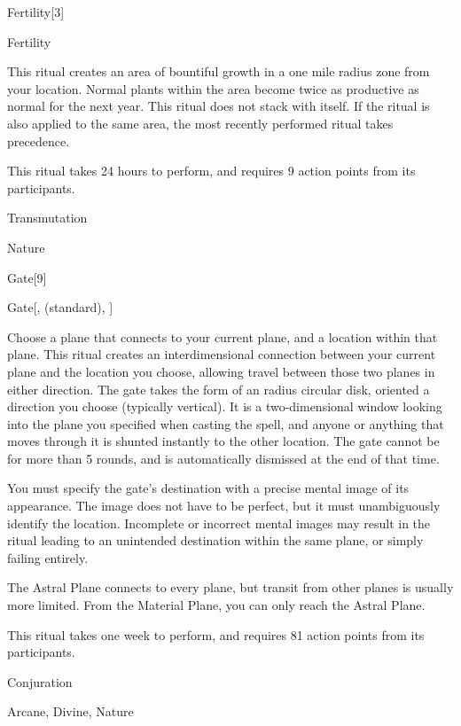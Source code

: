 \begin{spellsection}{Fertility}[3]


\begin{ability}{Fertility}

This ritual creates an area of bountiful growth in a one mile radius zone from your location.
Normal plants within the area become twice as productive as normal for the next year.
This ritual does not stack with itself.
If the  ritual is also applied to the same area, the most recently performed ritual takes precedence.

This ritual takes 24 hours to perform, and requires 9 action points from its participants.

\end{ability}




 Transmutation

 Nature
\end{spellsection}


\begin{spellsection}{Gate}[9]


\begin{ability}{Gate}[,  (standard), ]

Choose a plane that connects to your current plane, and a location within that plane.
This ritual creates an interdimensional connection between your current plane and the location you choose, allowing travel between those two planes in either direction.
The gate takes the form of an \areasmall radius circular disk, oriented a direction you choose (typically vertical).
It is a two-dimensional window looking into the plane you specified when casting the spell, and anyone or anything that moves through it is shunted instantly to the other location.
The gate cannot be  for more than 5 rounds, and is automatically dismissed at the end of that time.

You must specify the gate's destination with a precise mental image of its appearance.
The image does not have to be perfect, but it must unambiguously identify the location.
Incomplete or incorrect mental images may result in the ritual leading to an unintended destination within the same plane, or simply failing entirely.

The Astral Plane connects to every plane, but transit from other planes is usually more limited.
From the Material Plane, you can only reach the Astral Plane.

This ritual takes one week to perform, and requires 81 action points from its participants.

\end{ability}




 Conjuration

 Arcane, Divine, Nature
\end{spellsection}


